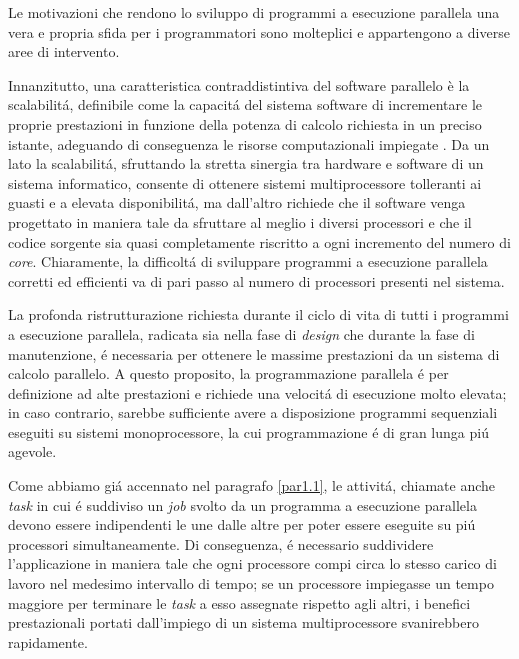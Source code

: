 Le motivazioni che rendono lo sviluppo di programmi a esecuzione parallela una vera e propria sfida per i programmatori
sono molteplici e appartengono a diverse aree di intervento.

Innanzitutto, una caratteristica contraddistintiva del software parallelo
è la scalabilit\'a, definibile come la capacit\'a del sistema software di incrementare le proprie prestazioni in funzione della potenza
di calcolo richiesta in un preciso istante, adeguando di conseguenza le risorse computazionali impiegate \cite{Michael2007}.\newline
Da un lato la scalabilit\'a, sfruttando la stretta sinergia tra hardware e software di un sistema informatico, consente di ottenere
sistemi multiprocessore tolleranti ai guasti e a elevata disponibilit\'a, ma dall'altro richiede che il software venga progettato
in maniera tale da sfruttare al meglio i diversi processori e che il codice sorgente sia quasi completamente riscritto a ogni
incremento del numero di \textit{core}.\newline
Chiaramente, la difficolt\'a di sviluppare programmi a esecuzione parallela corretti ed efficienti va di pari passo al numero
di processori presenti nel sistema.

La profonda ristrutturazione richiesta durante il ciclo di vita di tutti i  programmi a esecuzione parallela, radicata sia nella
fase di \textit{design} che durante la fase di manutenzione, \'e necessaria per ottenere le massime prestazioni da un
sistema di calcolo parallelo.\newline
A questo proposito, la programmazione parallela \'e per definizione ad alte prestazioni e richiede una
velocit\'a di esecuzione molto elevata; in caso contrario, sarebbe sufficiente avere a disposizione programmi sequenziali eseguiti su sistemi monoprocessore, la cui programmazione \'e di gran lunga pi\'u agevole.

Come abbiamo gi\'a accennato nel paragrafo \ref{par1.1}, le attivit\'a, chiamate anche \textit{task} in cui \'e suddiviso un \textit{job} svolto da un
programma a esecuzione parallela devono essere indipendenti le une dalle altre per poter essere eseguite su pi\'u processori simultaneamente.\newline
Di conseguenza, \'e necessario suddividere l'applicazione in maniera tale che ogni processore compi circa lo stesso carico di lavoro nel medesimo intervallo
di tempo; se un processore impiegasse un tempo maggiore per terminare le \textit{task} a esso assegnate rispetto agli altri, i benefici prestazionali portati
dall'impiego di un sistema multiprocessore svanirebbero rapidamente.

